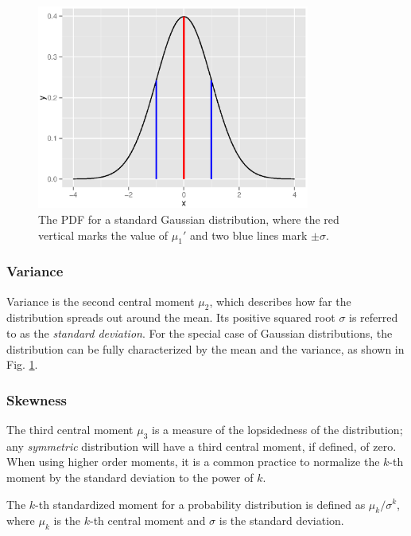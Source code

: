 \begin{figure}[!h]
\begin{center}
\includegraphics[width=0.8\textwidth]{figures/ch1_gaussian.eps}
\caption{The PDF for a standard Gaussian distribution, where the red vertical marks the value of $ \mu_1' $ and two blue lines mark $ \pm \sigma$. }
\label{fig:ch1_meanvar}
\end{center}
\end{figure}

\subsubsection{Variance}
Variance is the second central moment $ \mu_2 $, which describes how far the distribution spreads out around the mean. Its positive squared root $ \sigma $ is referred to as the \textit{standard deviation}. For the special case of Gaussian distributions, the distribution can be fully characterized by the mean and the variance, as shown in Fig. \ref{fig:ch1_meanvar}.

\subsubsection{Skewness}
The third central moment $ \mu_3 $ is a measure of the lopsidedness of the distribution; any \textit{symmetric} distribution will have a third central moment, if defined, of zero. When using higher order moments, it is a common practice to normalize the $ k $-th moment by the standard deviation to the power of $ k $.  

\begin{defn}
The $ k $-th standardized moment for a probability distribution is defined as $ \mu_k / \sigma^k $, where $ \mu_k $ is the $ k $-th central moment and $ \sigma $ is the standard deviation.
\end{defn}


